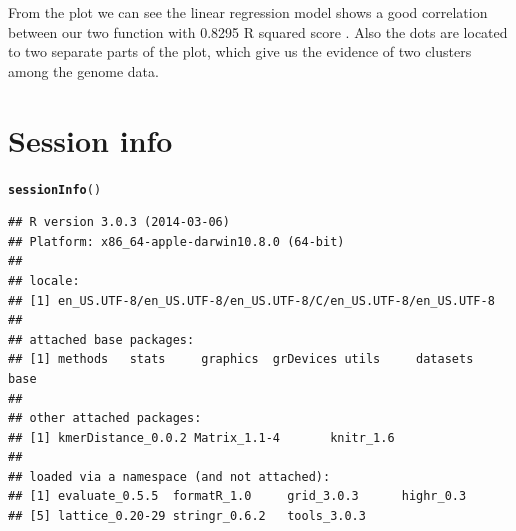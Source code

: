 \documentclass{article}\usepackage[]{graphicx}\usepackage[]{color}
\makeatletter
\newcommand{\hlstd}[1]{\textcolor[rgb]{0.345,0.345,0.345}{#1}}%
\newcommand{\hlkwd}[1]{\textcolor[rgb]{0.737,0.353,0.396}{\textbf{#1}}}%
\newenvironment{kframe}{%
 \def\at@end@of@kframe{}%
 \ifinner\ifhmode%
  \def\at@end@of@kframe{\end{minipage}}%
  \begin{minipage}{\columnwidth}%
 \fi\fi%
 \def\FrameCommand##1{\hskip\@totalleftmargin \hskip-\fboxsep
 \colorbox{shadecolor}{##1}\hskip-\fboxsep
     \hskip-\linewidth \hskip-\@totalleftmargin \hskip\columnwidth}%
 \MakeFramed {\advance\hsize-\width
   \@totalleftmargin\z@ \linewidth\hsize
   \@setminipage}}%
 {\par\unskip\endMakeFramed%
 \at@end@of@kframe}
\newenvironment{knitrout}{}{} %
\makeatother
\begin{document}
From the plot we can see the linear regression model shows a good correlation between our two function with 0.8295 R squared score  . Also the dots are located to two separate parts of the plot, which give us the evidence of two clusters among the genome data.


\section{Session info}
\label{sec.sessioninfo}

\begin{knitrout}
\color{fgcolor}\begin{kframe}
\begin{alltt}
\hlkwd{sessionInfo}\hlstd{()}
\end{alltt}
\begin{verbatim}
## R version 3.0.3 (2014-03-06)
## Platform: x86_64-apple-darwin10.8.0 (64-bit)
## 
## locale:
## [1] en_US.UTF-8/en_US.UTF-8/en_US.UTF-8/C/en_US.UTF-8/en_US.UTF-8
## 
## attached base packages:
## [1] methods   stats     graphics  grDevices utils     datasets  base     
## 
## other attached packages:
## [1] kmerDistance_0.0.2 Matrix_1.1-4       knitr_1.6         
## 
## loaded via a namespace (and not attached):
## [1] evaluate_0.5.5  formatR_1.0     grid_3.0.3      highr_0.3      
## [5] lattice_0.20-29 stringr_0.6.2   tools_3.0.3
\end{verbatim}
\end{kframe}
\end{knitrout}



\end{document}
